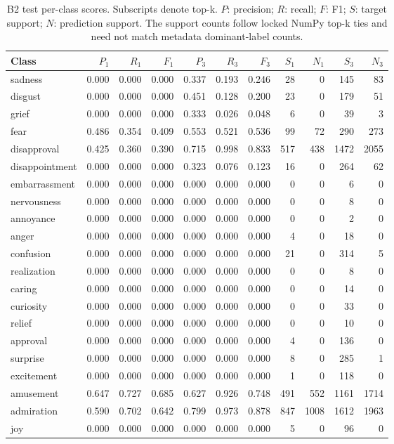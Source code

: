 \begin{table}[!htbp]
\centering
\scriptsize
\setlength{\tabcolsep}{5pt}
\begin{tabular}{lrrrrrrrrrr}
\toprule
Class & $P_1$ & $R_1$ & $F_1$ & $P_3$ & $R_3$ & $F_3$ & $S_1$ & $N_1$ & $S_3$ & $N_3$ \\
\midrule
sadness & 0.000 & 0.000 & 0.000 & 0.337 & 0.193 & 0.246 & 28 & 0 & 145 & 83 \\
disgust & 0.000 & 0.000 & 0.000 & 0.451 & 0.128 & 0.200 & 23 & 0 & 179 & 51 \\
grief & 0.000 & 0.000 & 0.000 & 0.333 & 0.026 & 0.048 & 6 & 0 & 39 & 3 \\
fear & 0.486 & 0.354 & 0.409 & 0.553 & 0.521 & 0.536 & 99 & 72 & 290 & 273 \\
disapproval & 0.425 & 0.360 & 0.390 & 0.715 & 0.998 & 0.833 & 517 & 438 & 1472 & 2055 \\
disappointment & 0.000 & 0.000 & 0.000 & 0.323 & 0.076 & 0.123 & 16 & 0 & 264 & 62 \\
embarrassment & 0.000 & 0.000 & 0.000 & 0.000 & 0.000 & 0.000 & 0 & 0 & 6 & 0 \\
nervousness & 0.000 & 0.000 & 0.000 & 0.000 & 0.000 & 0.000 & 0 & 0 & 8 & 0 \\
annoyance & 0.000 & 0.000 & 0.000 & 0.000 & 0.000 & 0.000 & 0 & 0 & 2 & 0 \\
anger & 0.000 & 0.000 & 0.000 & 0.000 & 0.000 & 0.000 & 4 & 0 & 18 & 0 \\
confusion & 0.000 & 0.000 & 0.000 & 0.000 & 0.000 & 0.000 & 21 & 0 & 314 & 5 \\
realization & 0.000 & 0.000 & 0.000 & 0.000 & 0.000 & 0.000 & 0 & 0 & 8 & 0 \\
caring & 0.000 & 0.000 & 0.000 & 0.000 & 0.000 & 0.000 & 0 & 0 & 14 & 0 \\
curiosity & 0.000 & 0.000 & 0.000 & 0.000 & 0.000 & 0.000 & 0 & 0 & 33 & 0 \\
relief & 0.000 & 0.000 & 0.000 & 0.000 & 0.000 & 0.000 & 0 & 0 & 10 & 0 \\
approval & 0.000 & 0.000 & 0.000 & 0.000 & 0.000 & 0.000 & 4 & 0 & 136 & 0 \\
surprise & 0.000 & 0.000 & 0.000 & 0.000 & 0.000 & 0.000 & 8 & 0 & 285 & 1 \\
excitement & 0.000 & 0.000 & 0.000 & 0.000 & 0.000 & 0.000 & 1 & 0 & 118 & 0 \\
amusement & 0.647 & 0.727 & 0.685 & 0.627 & 0.926 & 0.748 & 491 & 552 & 1161 & 1714 \\
admiration & 0.590 & 0.702 & 0.642 & 0.799 & 0.973 & 0.878 & 847 & 1008 & 1612 & 1963 \\
joy & 0.000 & 0.000 & 0.000 & 0.000 & 0.000 & 0.000 & 5 & 0 & 96 & 0 \\
\bottomrule
\end{tabular}
\caption{B2 test per-class scores. Subscripts denote top-k. $P$: precision; $R$: recall; $F$: F1; $S$: target support; $N$: prediction support. The support counts follow locked NumPy top-k ties and need not match metadata dominant-label counts.}
\label{tab:classes-b2_temporal}
\end{table}
